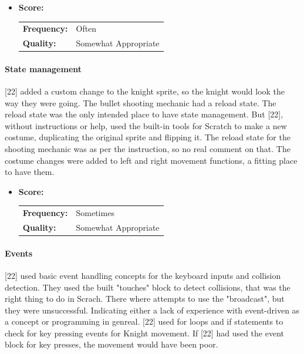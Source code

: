 \begin{itemize}
    \item \textbf{Score:}
    \begin{tabular}{ll}
        \textbf{Frequency:} & Often \\
        \textbf{Quality:}   & Somewhat Appropriate \\
    \end{tabular}
\end{itemize}

\paragraph{State management}

[22] added a custom change to the knight sprite, so the knight would look the way they were going.
The bullet shooting mechanic had a reload state.
The reload state was the only intended place to have state management.
But [22], without instructions or help, used the built-in tools for Scratch to make a new costume, duplicating the original sprite and flipping it.
The reload state for the shooting mechanic was as per the instruction, so no real comment on that.
The costume changes were added to left and right movement functions, a fitting place to have them.



\begin{itemize}
    \item \textbf{Score:}
    \begin{tabular}{ll}
        \textbf{Frequency:} & Sometimes \\
        \textbf{Quality:}   & Somewhat Appropriate \\
    \end{tabular}
\end{itemize}

\paragraph{Events}

[22] used basic event handling concepts for the keyboard inputs and collision detection. They used the built "touches" block to detect collisions, that was the right thing to do in Scrach.
There where attempts to use the "broadcast", but they were unsuccessful. Indicating either a lack of experience with event-driven as a concept or programming in genreal.
[22] used for loops and if statements to check for key pressing events for Knight movement.
If [22] had used the event block for key presses, the movement would have been poor.


